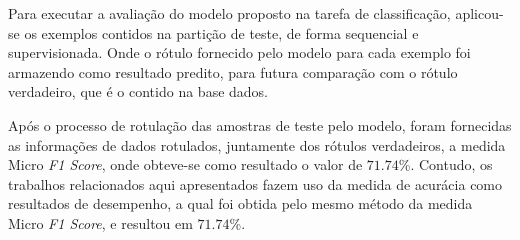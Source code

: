 Para executar a avaliação do modelo proposto na tarefa de classificação, aplicou-se os exemplos contidos na partição de teste, de forma sequencial e supervisionada. Onde o rótulo fornecido pelo modelo para cada exemplo foi armazendo como resultado predito, para futura comparação com o rótulo verdadeiro, que é o contido na base dados.

Após o processo de rotulação das amostras de teste pelo modelo, foram fornecidas as informações de dados rotulados, juntamente dos rótulos verdadeiros, a medida Micro \textit{F1 Score}, onde obteve-se como resultado o valor de $71.74$\%. Contudo, os trabalhos relacionados aqui apresentados fazem uso da medida de acurácia como resultados de desempenho, a qual foi obtida pelo mesmo método da medida Micro \textit{F1 Score}, e resultou em $71.74$\%.
